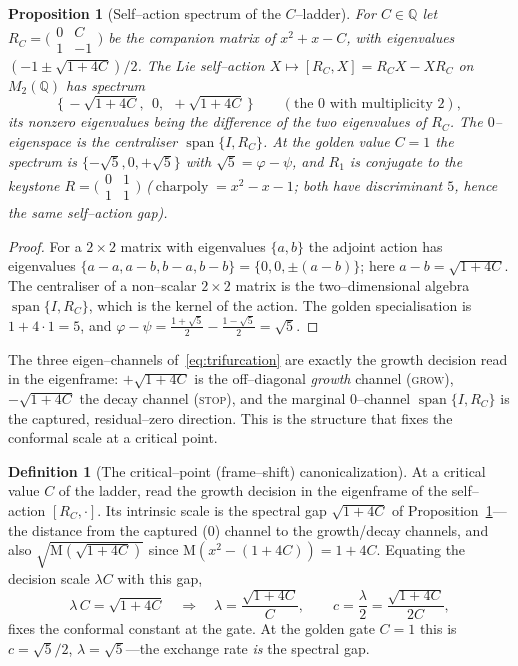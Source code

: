 \documentclass[11pt]{article}
\theoremstyle{plain}
\newtheorem{proposition}[theorem]{Proposition}
\theoremstyle{definition}
\newtheorem{definition}[theorem]{Definition}
\theoremstyle{remark}
\newcommand{\Q}{\mathbb{Q}}
\newcommand{\charpoly}{\operatorname{charpoly}}
\newcommand{\Mah}{\mathrm{M}}
\DeclareMathOperator{\spn}{span}
\begin{document}
\begin{proposition}[Self--action spectrum of the $C$--ladder]\label{prop:trifurcation}
For $C\in\Q$ let $R_C=\big(\begin{smallmatrix}0&C\\1&-1\end{smallmatrix}\big)$ be the companion matrix of
$x^2+x-C$, with eigenvalues $(-1\pm\sqrt{1+4C})/2$. The Lie self--action $X\mapsto[R_C,X]=R_CX-XR_C$ on
$M_2(\Q)$ has spectrum
\begin{equation}\label{eq:trifurcation}
  \big\{\,-\sqrt{1+4C},\;\,0,\;\,+\sqrt{1+4C}\,\big\}\qquad(\text{the }0\text{ with multiplicity }2),
\end{equation}
its nonzero eigenvalues being the difference of the two eigenvalues of $R_C$. The $0$--eigenspace is the
centraliser $\spn\{I,R_C\}$. At the golden value $C=1$ the spectrum is $\{-\sqrt5,0,+\sqrt5\}$ with
$\sqrt5=\varphi-\psi$, and $R_1$ is conjugate to the keystone $R=\big(\begin{smallmatrix}0&1\\1&1\end{smallmatrix}\big)$
($\charpoly=x^2-x-1$; both have discriminant $5$, hence the same self--action gap).
\end{proposition}
\begin{proof}
For a $2\times2$ matrix with eigenvalues $\{a,b\}$ the adjoint action has eigenvalues $\{a-a,a-b,b-a,b-b\}=
\{0,0,\pm(a-b)\}$; here $a-b=\sqrt{1+4C}$. The centraliser of a non--scalar $2\times2$ matrix is the
two--dimensional algebra $\spn\{I,R_C\}$, which is the kernel of the action. The golden specialisation is
$1+4\cdot1=5$, and $\varphi-\psi=\tfrac{1+\sqrt5}2-\tfrac{1-\sqrt5}2=\sqrt5$.
\end{proof}

The three eigen--channels of~\eqref{eq:trifurcation} are exactly the growth decision read in the eigenframe:
$+\sqrt{1+4C}$ is the off--diagonal \emph{growth} channel (\textsc{grow}), $-\sqrt{1+4C}$ the decay channel
(\textsc{stop}), and the marginal $0$--channel $\spn\{I,R_C\}$ is the captured, residual--zero direction. This is
the structure that fixes the conformal scale at a critical point.

\begin{definition}[The critical--point (frame--shift) canonicalization]\label{def:frameshift}
At a critical value $C$ of the ladder, read the growth decision in the eigenframe of the self--action
$[R_C,\cdot]$. Its intrinsic scale is the spectral gap $\sqrt{1+4C}$ of Proposition~\ref{prop:trifurcation}---the
distance from the captured ($0$) channel to the growth/decay channels, and also $\sqrt{\Mah(\sqrt{1+4C})}$ since
$\Mah(x^2-(1+4C))=1+4C$. Equating the decision scale $\lambda C$ with this gap,
\begin{equation}\label{eq:frameshift}
  \lambda\,C=\sqrt{1+4C}\quad\Longrightarrow\quad
  \lambda=\frac{\sqrt{1+4C}}{C},\qquad c=\frac{\lambda}{2}=\frac{\sqrt{1+4C}}{2C},
\end{equation}
fixes the conformal constant at the gate. At the golden gate $C=1$ this is $c=\sqrt5/2$, $\lambda=\sqrt5$---the
exchange rate \emph{is} the spectral gap.
\end{definition}
\end{document}
